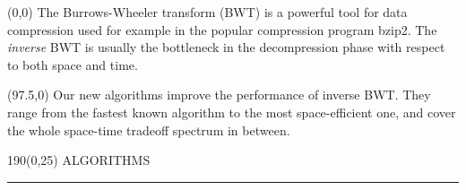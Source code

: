 \documentclass[a4paper]{article} %
\begin{document}
\begin{textblock}{92.5}(0,0)
\sffamily
\small 
The Burrows-Wheeler transform (BWT) is a powerful tool for data
compression used for example in the popular compression program
bzip2. The \emph{inverse} BWT is usually the bottleneck in the
decompression phase with respect to both space and time.
\end{textblock}
\begin{textblock}{92.5}(97.5,0) 
  \sffamily \small 
  Our new algorithms improve the performance of inverse BWT.  They
  range from the fastest known algorithm to the most space-efficient
  one, and cover the whole space-time tradeoff spectrum in between.
\end{textblock}

\begin{textblock}{190}(0,25)
\sffamily
\Large{\color{sciorange}ALGORITHMS}\small\\
\rule[3mm]{190mm}{0.1pt}
\end{textblock} 

%
\end{document}
